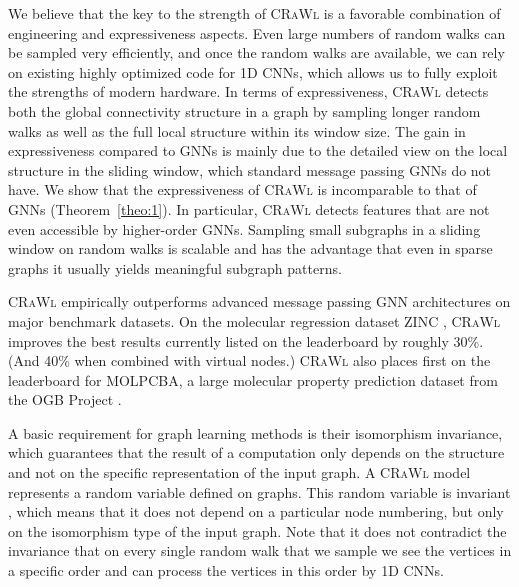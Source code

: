 \documentclass{scrartcl} \usepackage[dvipsnames]{xcolor}
\newcommand{\crawl}{\textsc{CRaWl}}
\begin{document}
We believe that the key to the strength of \crawl{} is a favorable combination of engineering and expressiveness aspects. 
Even large numbers of random walks can be sampled very efficiently, and once the random walks are available, we can rely on existing highly optimized code for 1D CNNs, which allows us to fully exploit the strengths of modern hardware. 
In terms of expressiveness, \crawl{} detects both the global connectivity structure in a graph by sampling longer random walks as well as the full local structure within its window size. 
The gain in expressiveness compared to GNNs is mainly due to the detailed view on the local structure in the sliding window, which standard message passing GNNs \citep[e.g.][]{GilmerSRVD17} do not have. 
We show that the expressiveness of \crawl{} is incomparable to that of GNNs (Theorem~\ref{theo:1}). 
In particular, \crawl{} detects features that are not even accessible by higher-order GNNs. 
Sampling small subgraphs in a sliding window on random walks is scalable and has the advantage that even in sparse graphs it usually yields meaningful subgraph patterns.







\crawl{} empirically outperforms advanced message passing GNN architectures on major benchmark datasets. 
On the molecular regression dataset ZINC \cite{dwivedi2020benchmarkgnns}, \crawl{} improves the best results currently listed on the leaderboard by roughly 30\%. (And  40\% when combined with virtual nodes.)  \crawl{} also places first on the leaderboard for MOLPCBA, a large molecular property prediction dataset from the OGB Project \cite{hu2020ogb}.





A basic requirement for graph learning methods is their isomorphism invariance, which guarantees that the result of a computation only depends on the structure and not on the specific representation of the input graph. 
A \crawl{} model represents a random variable defined on graphs.
This random variable is invariant \citep[in the sense of][]{MaronInvEqui19}, which means that it does not depend on a particular node numbering, but only on the isomorphism type of the input graph. 
Note that it does not contradict the invariance that on every single random walk that we sample we see the vertices in a specific order and can process the vertices in this order by  1D CNNs.
\end{document}
